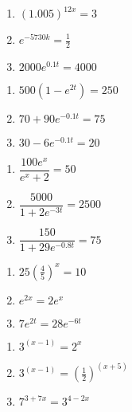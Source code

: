 \begin{multicols}{3}
\begin{enumerate}
\setcounter{enumi}{\value{HW}}

\item $(1.005)^{12x} = 3$
\item $e^{-5730k} = \frac{1}{2}$ 
\item $2000e^{0.1t} = 4000$  

\setcounter{HW}{\value{enumi}}
\end{enumerate}
\end{multicols}

\begin{multicols}{3}
\begin{enumerate}
\setcounter{enumi}{\value{HW}}


\item $500\left(1-e^{2t}\right) = 250$
\item $70 + 90e^{-0.1t} = 75$ 
\item $30-6e^{-0.1t}=20$ 


\setcounter{HW}{\value{enumi}}
\end{enumerate}
\end{multicols}

\begin{multicols}{3}
\begin{enumerate}
\setcounter{enumi}{\value{HW}}

\item $\dfrac{100e^{x}}{e^{x}+2}=50$ 
\item $\dfrac{5000}{1+2e^{-3t}}=2500$ 
\item $\dfrac{150}{1 + 29e^{-0.8t}} = 75$ 


\setcounter{HW}{\value{enumi}}
\end{enumerate}
\end{multicols}

\begin{multicols}{3}
\begin{enumerate}
\setcounter{enumi}{\value{HW}}

\item $25\left(\frac{4}{5}\right)^{x} = 10$  

\item $e^{2x} = 2e^{x}$ 
\item  $7e^{2t} = 28e^{-6t}$ 

\setcounter{HW}{\value{enumi}}
\end{enumerate}
\end{multicols}

\begin{multicols}{3}
\begin{enumerate}
\setcounter{enumi}{\value{HW}}

\item $3^{(x - 1)} = 2^{x}$ 
\item $3^{(x - 1)} = \left(\frac{1}{2}\right)^{(x + 5)}$ 
\item  $7^{3+7x} = 3^{4-2x}$  

\setcounter{HW}{\value{enumi}}
\end{enumerate}
\end{multicols}

